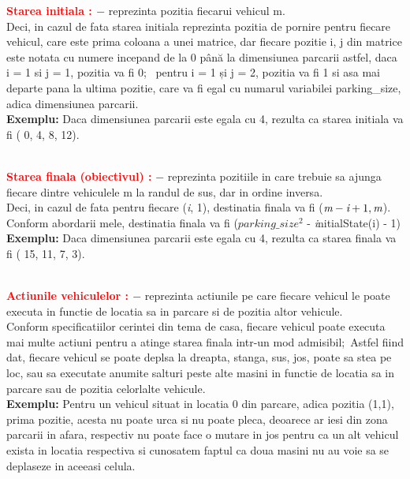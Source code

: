 \documentclass{article}
\begin{document}
\textbf{\textcolor{red}{Starea initiala : }} $-$ reprezinta pozitia fiecarui vehicul m. \\
Deci, in cazul de fata starea initiala reprezinta pozitia de pornire pentru fiecare vehicul, care este prima coloana a unei matrice, dar fiecare pozitie i, j din matrice este notata cu numere incepand de la 0 până la dimensiunea parcarii astfel, daca i = 1 si j = 1, pozitia va fi 0; \ pentru i = 1 și j = 2, pozitia va fi 1 si asa mai departe pana la ultima pozitie, care va fi egal cu numarul variabilei parking\_size, adica dimensiunea parcarii.\\ 
\newline
\textbf{Exemplu: }Daca dimensiunea parcarii este egala cu 4, rezulta ca starea initiala va fi ( 0, 4, 8, 12).\\\

\textbf{\textcolor{red}{Starea finala (obiectivul) :}} $-$ reprezinta pozitiile in care trebuie sa ajunga fiecare dintre vehiculele m la randul de sus, dar in ordine inversa.\\
Deci, in cazul de fata pentru fiecare (\emph i, 1), destinatia finala va fi (\(\emph m - \emph i + 1, \emph m \)). Conform abordarii mele, destinatia finala va fi (\(parking\_size^2\) - \emph initialState(i) - 1)\\
\newline\textbf{Exemplu: }Daca dimensiunea parcarii este egala cu 4, rezulta ca starea finala va fi ( 15, 11, 7, 3).\\\

\textbf{\textcolor{red}{Actiunile vehiculelor : }} $-$ reprezinta actiunile pe care fiecare vehicul le poate executa in functie de locatia sa in parcare si de pozitia altor vehicule.\\
Conform specificatiilor cerintei din tema de casa, fiecare vehicul poate executa mai multe actiuni pentru a atinge starea finala intr-un mod admisibil;\ Astfel fiind dat, fiecare vehicul se poate deplsa la dreapta, stanga, sus, jos, poate sa stea pe loc, sau sa executate anumite salturi peste alte masini in functie de locatia sa in parcare sau de pozitia celorlalte vehicule.\\
\newline
\textbf{Exemplu: }Pentru un vehicul situat in locatia 0 din parcare, adica pozitia (1,1), prima pozitie, acesta nu poate urca si nu poate pleca, deoarece ar iesi din zona parcarii in afara, respectiv nu poate face o mutare in jos pentru ca un alt vehicul exista in locatia respectiva si cunosatem faptul ca doua masini nu au voie sa se deplaseze in aceeasi celula.
\par
\end{document}
